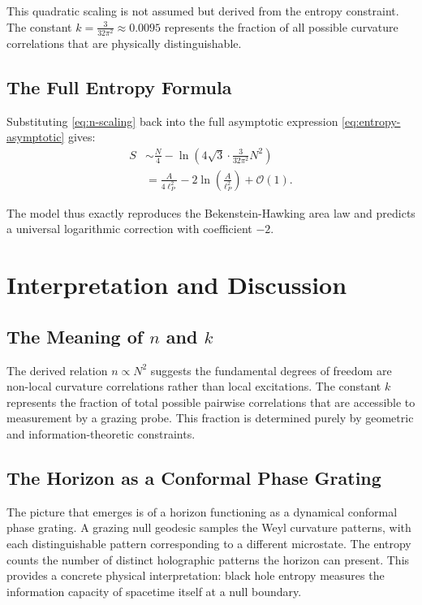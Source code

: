\documentclass[12pt, letterpaper]{article}
\begin{document}
This quadratic scaling is not assumed but derived from the entropy constraint. The constant $k = \frac{3}{32\pi^2} \approx 0.0095$ represents the fraction of all possible curvature correlations that are physically distinguishable.

\subsection{The Full Entropy Formula}
Substituting \cref{eq:n-scaling} back into the full asymptotic expression \cref{eq:entropy-asymptotic} gives:
\begin{align}
S &\sim \frac{N}{4} - \ln\left(4 \sqrt{3} \cdot \frac{3}{32\pi^2} N^2 \right) \\
  &= \frac{A}{4\ell_P^2} - 2 \ln\left( \frac{A}{\ell_P^2} \right) + \mathcal{O}(1).
\label{eq:full-entropy}
\end{align}

The model thus exactly reproduces the Bekenstein-Hawking area law and predicts a universal logarithmic correction with coefficient $-2$.

\section{Interpretation and Discussion}
\label{sec:discussion}

\subsection{The Meaning of $n$ and $k$}
The derived relation $n \propto N^2$ suggests the fundamental degrees of freedom are non-local curvature correlations rather than local excitations. The constant $k$ represents the fraction of total possible pairwise correlations that are accessible to measurement by a grazing probe. This fraction is determined purely by geometric and information-theoretic constraints.

\subsection{The Horizon as a Conformal Phase Grating}
The picture that emerges is of a horizon functioning as a dynamical conformal phase grating. A grazing null geodesic samples the Weyl curvature patterns, with each distinguishable pattern corresponding to a different microstate. The entropy counts the number of distinct holographic patterns the horizon can present. This provides a concrete physical interpretation: black hole entropy measures the information capacity of spacetime itself at a null boundary.
\end{document}
